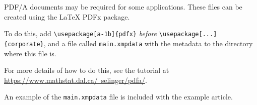 PDF/A documents may be required for some applications. These files can be created using the LaTeX PDFx package. 

To do this, add \verb+\usepackage[a-1b]{pdfx}+ \emph{before} \verb+\usepackage[...]{corporate}+, and a file called \texttt{main.xmpdata} with the metadata to the directory where this file is. 

For more details of how to do this, see the tutorial at \href{https://www.mathstat.dal.ca/~selinger/pdfa/}{https://www.mathstat.dal.ca/~selinger/pdfa/}.

An example of the \texttt{main.xmpdata} file is included with the example article.